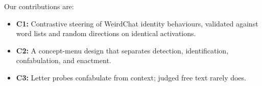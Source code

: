 Our contributions are:
\begin{itemize}[noitemsep, topsep=0pt, leftmargin=*]
    \item \textbf{C1:} Contrastive steering of WeirdChat identity
          behaviours, validated against word lists and random directions
          on identical activations.
    \item \textbf{C2:} A concept-menu design that separates detection,
          identification, confabulation, and enactment.
    \item \textbf{C3:} Letter probes confabulate from context; judged
          free text rarely does.
\end{itemize}
